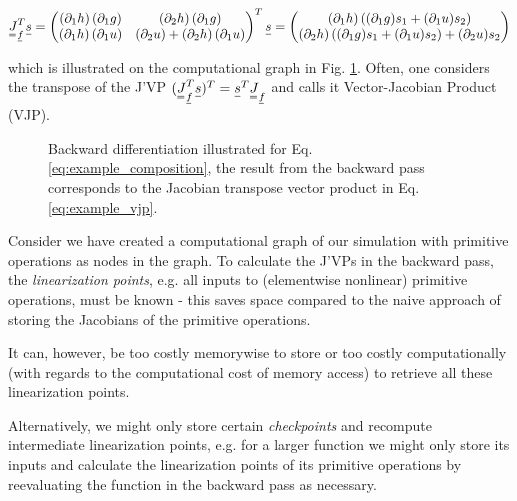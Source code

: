 \begin{equation}
    \mat{J}_\vec{f}^T \vec{s} = \begin{pmatrix}
                                (\partial_1 h)\,(\partial_1 g) & (\partial_2 h)\,(\partial_1 g) \\
                                (\partial_1 h)\,(\partial_1 u) & (\partial_2 u) + (\partial_2 h)\,(\partial_1 u)
                              \end{pmatrix}^T \vec{s}
                            = \begin{pmatrix}
                                (\partial_1 h)\,((\partial_1 g) s_1 + (\partial_1 u) s_2) \\
                                (\partial_2 h)\,((\partial_1 g) s_1 + (\partial_1 u) s_2) + (\partial_2 u) s_2
                              \end{pmatrix} 
    \label{eq:example_vjp}
\end{equation}

which is illustrated on the computational graph in Fig. \ref{fig:backward_diff}. Often, one considers
the transpose of the J'VP $(\mat{J}_\vec{f}^T \vec{s})^T=\vec{s}^T \mat{J}_\vec{f}$ and calls
it Vector-Jacobian Product (VJP).

\begin{figure}[!htb]
 \centering
 \hfill
 \caption{Backward differentiation illustrated for Eq. \ref{eq:example_composition}, the result
 from the backward pass corresponds to the Jacobian transpose vector product in Eq. \ref{eq:example_vjp}.}
 \label{fig:backward_diff}
\end{figure}

\label{sec:checkpointing}
Consider we have created a computational graph of our simulation 
with primitive operations as nodes in the graph. To calculate the J'VPs 
in the backward pass, the \textit{linearization points}, e.g. all inputs to
(elementwise nonlinear) primitive operations, must be known - this saves
space compared to the naive approach of storing the Jacobians of the primitive
operations.

It can, however, be too costly memorywise to store or too costly computationally (with regards
to the computational cost of memory access)
to retrieve all these linearization points.

Alternatively, we might only store certain \textit{checkpoints} and recompute intermediate 
linearization points, e.g. for a larger function we might only store its inputs and
calculate the linearization points of its primitive operations by reevaluating the
function in the backward pass as necessary.

